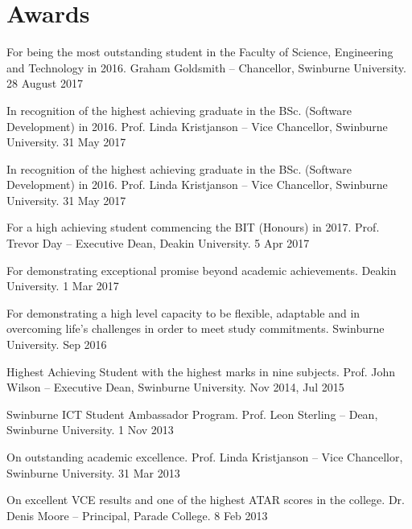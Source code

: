 \section{Awards}

{For being the most outstanding student in the Faculty of Science, Engineering and Technology in 2016.}
{Graham Goldsmith -- Chancellor, Swinburne University.}
{28 August 2017}

{In recognition of the highest achieving graduate in the BSc. (Software Development) in 2016.}
{Prof. Linda Kristjanson -- Vice Chancellor, Swinburne University.}
{31 May 2017}

{In recognition of the highest achieving graduate in the BSc. (Software Development) in 2016.}
{Prof. Linda Kristjanson -- Vice Chancellor, Swinburne University.}
{31 May 2017}

\clearpage

{For a high achieving student commencing the BIT (Honours) in 2017.}
{Prof. Trevor Day -- Executive Dean, Deakin University.}
{5 Apr 2017}

{For demonstrating exceptional promise beyond academic achievements.}
{Deakin University.}
{1 Mar 2017}


{For demonstrating a high level capacity to be flexible, adaptable and in overcoming life's challenges in order to meet study commitments.}
{Swinburne University.}
{Sep 2016}

{Highest Achieving Student with the highest marks in nine subjects.}
{Prof. John Wilson -- Executive Dean, Swinburne University.}
{Nov 2014, Jul 2015}

{Swinburne ICT Student Ambassador Program.}
{Prof. Leon Sterling -- Dean, Swinburne University.}
{1 Nov 2013}

{On outstanding academic excellence.}
{Prof. Linda Kristjanson -- Vice Chancellor, Swinburne University.}
{31 Mar 2013}

{On excellent VCE results and one of the highest ATAR scores in the college.}
{Dr. Denis Moore -- Principal, Parade College.}
{8 Feb 2013}
